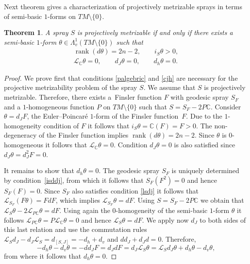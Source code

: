 \documentclass[11pt]{article}
\numberwithin{equation}{section}
\newtheorem{Theorem}{Theorem}[section]
\begin{document}
Next theorem gives a characterization of projectively metrizable sprays in
terms of semi-basic $1$-forms on $TM\setminus\{0\}$.
\begin{Theorem} \label{thm:pm} A spray $S$ is projectively
metrizable if and only if there exists a semi-basic $1$-form
$\theta\in \Lambda^1_v(TM\setminus\{0\})$ such that
\begin{gather}
\operatorname{rank}\left(d\theta\right)=2n-2, \qquad i_S\theta>0,
\label{palgebric} \\ \mathcal{L}_{\mathbb{C}}\theta =0, \qquad
d_J\theta=0, \qquad d_h\theta=0. \label{cjh}\end{gather}
\end{Theorem}
\begin{proof}
We prove f\/irst that conditions \eqref{palgebric} and \eqref{cjh} are
necessary for the projective metri\-za\-bility problem of the spray $S$.
We assume that $S$ is projectively metrizable. Therefore, there
exists a~Finsler function $F$ with geodesic spray $S_F$ and a
$1$-homogeneous function $P$ on $TM\setminus\{0\}$ such that
$S=S_F-2P\mathbb{C}$. Consider $\theta=d_JF$, the Euler--Poincar\'e
$1$-form of the Finsler function~$F$. Due to the $1$-homogeneity
condition of $F$ it follows that $i_S\theta=\mathbb{C}(F)=F>0$. The non-degeneracy
of the Finsler function implies
$\operatorname{rank}\left(d\theta\right)=2n-2$. Since $\theta$ is
$0$-homogeneous it follows that
$\mathcal{L}_{\mathbb{C}}\theta=0$. Condition $d_J\theta=0$ is
also satisf\/ied since $d_J\theta=d_J^2F=0$.

It remains to show that $d_h\theta=0$. The geodesic spray $S_F$ is
uniquely determined by condi\-tion~\eqref{isddj}, from which it
follows that $S_F(F^2)=0$ and hence $S_F(F)=0$. Since $S_F$ also
satis\-f\/ies condition \eqref{lsdj} it follows that
$\mathcal{L}_{S_F}\left(F\theta\right)=FdF$, which implies
$\mathcal{L}_{S_F}\theta=dF$. Using $S=S_F-2P\mathbb{C}$ we obtain
that $\mathcal{L}_{S}\theta -2 \mathcal{L}_{P\mathbb{C}}\theta=dF$.
Using again the $0$-homogeneity of the semi-basic $1$-form $\theta$ it
follows $\mathcal{L}_{P\mathbb{C}}\theta= P
\mathcal{L}_{\mathbb{C}}\theta=0$ and hence
$\mathcal{L}_{S}\theta=dF$. We apply now $d_J$ to both sides of
this last relation and use the commutation rules
$\mathcal{L}_Sd_J-d_J\mathcal{L}_S=d_{[S,J]}=-d_{h}+d_{v}$ and
$dd_J+d_Jd=0.$ Therefore,
\[
-d_h\theta-d_v\theta=-dd_JF=d_JdF=d_J\mathcal{L}_{S}\theta=
\mathcal{L}_Sd_J\theta + d_{h}\theta- d_{v}\theta,
\] from where
it follows that $d_h\theta=0$.


\end{proof}
\end{document}
